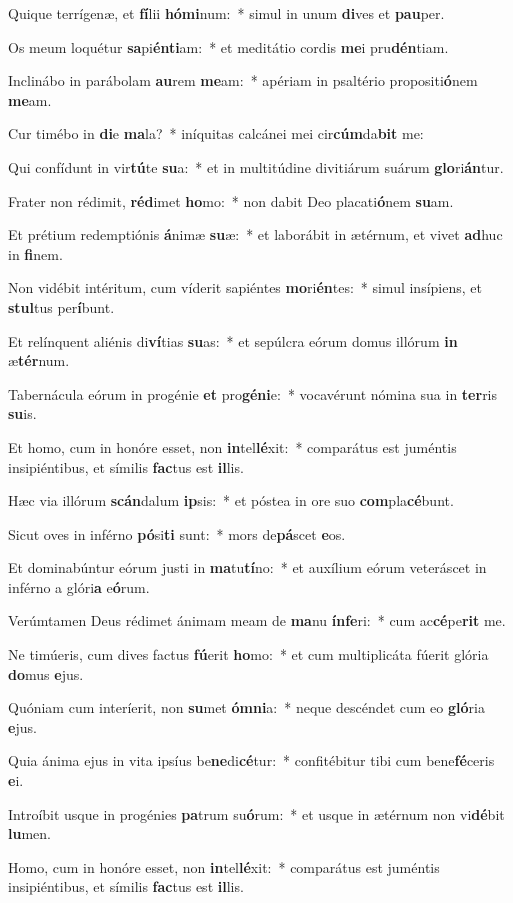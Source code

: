 \item Quique terrígenæ, et \textbf{fí}lii \textbf{hó}\textbf{mi}num:~* simul in unum \textbf{di}ves et \textbf{pau}per.
\item Os meum loquétur \textbf{sa}pi\textbf{én}\textbf{ti}am:~* et meditátio cordis \textbf{me}i pru\textbf{dén}tiam.
\item Inclinábo in parábolam \textbf{au}rem \textbf{me}am:~* apériam in psaltério propositi\textbf{ó}nem \textbf{me}am.
\item Cur timébo in \textbf{di}e \textbf{ma}la?~* iníquitas calcánei mei cir\textbf{cúm}da\textbf{bit} me:
\item Qui confídunt in vir\textbf{tú}te \textbf{su}a:~* et in multitúdine divitiárum suárum \textbf{glo}ri\textbf{án}tur.
\item Frater non rédimit, \textbf{réd}imet \textbf{ho}mo:~* non dabit Deo placati\textbf{ó}nem \textbf{su}am.
\item Et prétium redemptiónis \textbf{á}nimæ \textbf{su}æ:~* et laborábit in ætérnum, et vivet \textbf{ad}huc in \textbf{fi}nem.
\item Non vidébit intéritum, cum víderit sapiéntes \textbf{mo}ri\textbf{én}tes:~* simul insípiens, et \textbf{stul}tus per\textbf{í}bunt.
\item Et relínquent aliénis di\textbf{ví}tias \textbf{su}as:~* et sepúlcra eórum domus illórum \textbf{in} æ\textbf{tér}num.
\item Tabernácula eórum in progénie \textbf{et} pro\textbf{gé}\textbf{ni}e:~* vocavérunt nómina sua in \textbf{ter}ris \textbf{su}is.
\item Et homo, cum in honóre esset, non \textbf{in}tel\textbf{lé}xit:~* comparátus est juméntis insipiéntibus, et símilis \textbf{fac}tus est \textbf{il}lis.
\item Hæc via illórum \textbf{scán}dalum \textbf{ip}sis:~* et póstea in ore suo \textbf{com}pla\textbf{cé}bunt.
\item Sicut oves in inférno \textbf{pó}si\textbf{ti} sunt:~* mors de\textbf{pá}scet \textbf{e}os.
\item Et dominabúntur eórum justi in \textbf{ma}tu\textbf{tí}no:~* et auxílium eórum veteráscet in inférno a glóri\textbf{a} e\textbf{ó}rum.
\item Verúmtamen Deus rédimet ánimam meam de \textbf{ma}nu \textbf{ín}\textbf{fe}ri:~* cum ac\textbf{cé}pe\textbf{rit} me.
\item Ne timúeris, cum dives factus \textbf{fú}erit \textbf{ho}mo:~* et cum multiplicáta fúerit glória \textbf{do}mus \textbf{e}jus.
\item Quóniam cum interíerit, non \textbf{su}met \textbf{óm}\textbf{ni}a:~* neque descéndet cum eo \textbf{gló}ria \textbf{e}jus.
\item Quia ánima ejus in vita ipsíus be\textbf{ne}di\textbf{cé}tur:~* confitébitur tibi cum bene\textbf{fé}ceris \textbf{e}i.
\item Introíbit usque in progénies \textbf{pa}trum su\textbf{ó}rum:~* et usque in ætérnum non vi\textbf{dé}bit \textbf{lu}men.
\item Homo, cum in honóre esset, non \textbf{in}tel\textbf{lé}xit:~* comparátus est juméntis insipiéntibus, et símilis \textbf{fac}tus est \textbf{il}lis.
